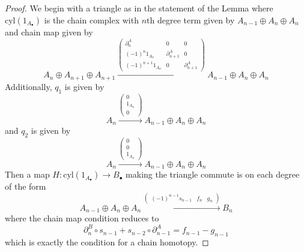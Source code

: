 \begin{proof}
    We begin with a triangle as in the statement of the Lemma where $\text{cyl}(1_{A_\bullet})$ is the chain complex with $n$th degree term given by $A_{n-1}\oplus A_n\oplus A_n$ and chain map given by 
    \begin{equation*}
        A_n\oplus A_{n+1}\oplus A_{n+1}\xrightarrow{\begin{pmatrix} \partial_n^A & 0 & 0 \\ (-1)^n1_{A_n} & \partial_{n+1}^A & 0 \\ (-1)^{n+1}1_{A_n} & 0 & \partial_{n+1}^A \end{pmatrix}}A_{n-1}\oplus A_n\oplus A_n
    \end{equation*}
    Additionally, $q_1$ is given by 
    \begin{equation*}
        A_n\xrightarrow{\begin{pmatrix} 0 \\ 1_{A_n} \\ 0 \end{pmatrix}} A_{n-1}\oplus A_n\oplus A_n
    \end{equation*}
    and $q_2$ is given by 
    \begin{equation*}
        A_n\xrightarrow{\begin{pmatrix} 0 \\ 0 \\ 1_{A_n} \end{pmatrix}} A_{n-1}\oplus A_n\oplus A_n
    \end{equation*}
    Then a map $H:\text{cyl}(1_{A_\bullet})\to B_\bullet$ making the triangle commute is on each degree of the form
    \begin{equation*}
        A_{n-1}\oplus A_n\oplus A_n\xrightarrow{\begin{pmatrix} (-1)^{n-1}s_{n-1} & f_n & g_n \end{pmatrix}} B_n
    \end{equation*}
    where the chain map condition reduces to 
    \begin{equation*}
        \partial_n^B\circ s_{n-1}+s_{n-2}\circ \partial_{n-1}^A = f_{n-1}-g_{n-1}
    \end{equation*}
    which is exactly the condition for a chain homotopy.
\end{proof}



